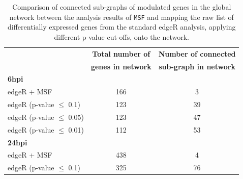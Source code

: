 \documentclass[10pt,a4paper,twocolumn]{article}
\begin{document}
\begin{table}[]
	\centering
	\caption{Comparison of connected sub-graphs of modulated genes
          in the global network between the analysis results of
          \texttt{MSF} and mapping the raw list of differentially
          expressed genes from the standard edgeR analysis, applying
          different p-value cut-offs, onto the network. }
	\label{tab:rawVsHartung}
	\begin{tabular}{lll}
		\hline
		\multicolumn{1}{|l|}{}                            & \multicolumn{1}{c|}{\textbf{Total number of}}       & \multicolumn{1}{c|}{\textbf{Number of connected}}      \\
                \multicolumn{1}{|l|}{}                            & \multicolumn{1}{c|}{\textbf{genes in network}}      & \multicolumn{1}{c|}{\textbf{sub-graph in network}}     \\ \hline
		\multicolumn{1}{|l|}{\textbf{6hpi}}               & \multicolumn{1}{l|}{}                                                & \multicolumn{1}{c|}{}                 \\ \hline
		\multicolumn{1}{|l|}{edgeR + MSF}                 & \multicolumn{1}{c|}{166}                                             & \multicolumn{1}{c|}{3}                \\ \hline
		\multicolumn{1}{|l|}{edgeR (p-value $\leq$ 0.1)}  & \multicolumn{1}{c|}{123}                                             & \multicolumn{1}{c|}{39}               \\ \hline
		\multicolumn{1}{|l|}{edgeR (p-value $\leq$ 0.05)} & \multicolumn{1}{c|}{123}                                             & \multicolumn{1}{c|}{47}               \\ \hline
		\multicolumn{1}{|l|}{edgeR (p-value $\leq$ 0.01)} & \multicolumn{1}{c|}{112}                                             & \multicolumn{1}{c|}{53}               \\ \hline
		\multicolumn{1}{|l|}{\textbf{24hpi}}              & \multicolumn{1}{c|}{}                                                & \multicolumn{1}{c|}{}                 \\ \hline
		\multicolumn{1}{|l|}{edgeR + MSF}                 & \multicolumn{1}{c|}{438}                                             & \multicolumn{1}{c|}{4}                \\ \hline
		\multicolumn{1}{|l|}{edgeR (p-value $\leq$ 0.1)}  & \multicolumn{1}{c|}{325}                                             & \multicolumn{1}{c|}{76}               \\ \hline

\end{tabular}
\end{table}
\end{document}

